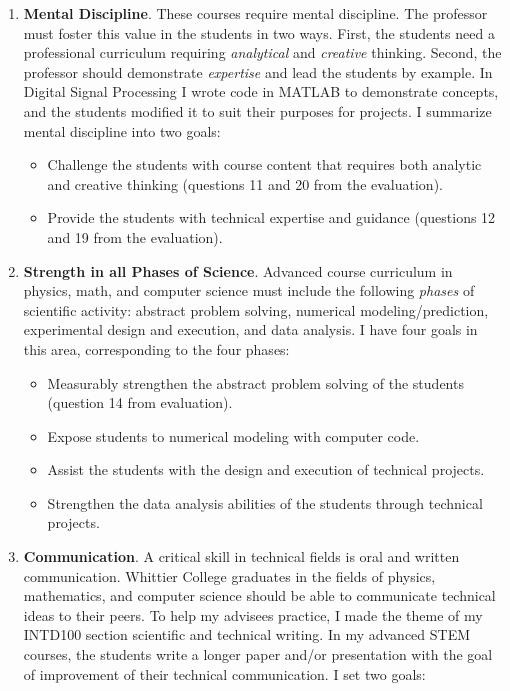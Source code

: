 \documentclass[../../../main.tex]{subfiles}
\begin{document}
\begin{enumerate}
\item \textbf{Mental Discipline}.  These courses require mental discipline.  The professor must foster this value in the students in two ways.  First, the students need a professional curriculum requiring \textit{analytical} and \textit{creative} thinking.  Second, the professor should demonstrate \textit{expertise} and lead the students by example.  In Digital Signal Processing I wrote code in MATLAB to demonstrate concepts, and the students modified it to suit their purposes for projects.  I summarize mental discipline into two goals:

\begin{itemize}
\item Challenge the students with course content that requires both analytic and creative thinking (questions 11 and 20 from the evaluation).
\item Provide the students with technical expertise and guidance (questions 12 and 19 from the evaluation).
\end{itemize}

\item \textbf{Strength in all Phases of Science}. Advanced course curriculum in physics, math, and computer science must include the following \textit{phases} of scientific activity: abstract problem solving, numerical modeling/prediction, experimental design and execution, and data analysis. I have four goals in this area, corresponding to the four phases:

\begin{itemize}
\item Measurably strengthen the abstract problem solving of the students (question 14 from evaluation).
\item Expose students to numerical modeling with computer code.
\item Assist the students with the design and execution of technical projects.
\item Strengthen the data analysis abilities of the students through technical projects.
\end{itemize}

\item \textbf{Communication}.  A critical skill in technical fields is oral and written communication.  Whittier College graduates in the fields of physics, mathematics, and computer science should be able to communicate technical ideas to their peers.  To help my advisees practice, I made the theme of my INTD100 section scientific and technical writing.  In my advanced STEM courses, the students write a longer paper and/or presentation with the goal of improvement of their technical communication.  I set two goals:


\end{enumerate}
\end{document}
